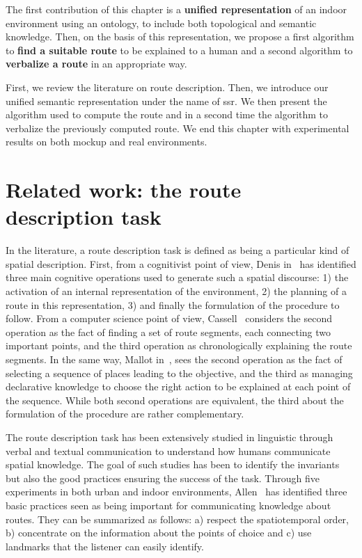 The first contribution of this chapter is a \textbf{unified representation} of an indoor environment using an ontology, to include both topological and semantic knowledge. Then, on the basis of this representation, we propose a first algorithm to \textbf{find a suitable route} to be explained to a human and a second algorithm to \textbf{verbalize a route} in an appropriate way.

First, we review the literature on route description. Then, we introduce our unified semantic representation under the name of \acrfull{ssr}. We then present the algorithm used to compute the route and in a second time the algorithm to verbalize the previously computed route. We end this chapter with experimental results on both mockup and real environments.

\section[Related work]{Related work: the route description task}


In the literature, a route description task is defined as being a particular kind of spatial description. First, from a cognitivist point of view, Denis in~\cite{denis_1997_description} has identified three main cognitive operations used to generate such a spatial discourse: 1) the activation of an internal representation of the environment, 2) the planning of a route in this representation, 3) and finally the formulation of the procedure to follow. From a computer science point of view, Cassell~\cite{cassell_2007_trading} considers the second operation as the fact of finding a set of route segments, each connecting two important points, and the third operation as chronologically explaining the route segments. In the same way, Mallot in~\cite{mallot_2009_embodied}, sees the second operation as the fact of selecting a sequence of places leading to the objective, and the third as managing declarative knowledge to choose the right action to be explained at each point of the sequence. While both second operations are equivalent, the third about the formulation of the procedure are rather complementary.

The route description task has been extensively studied in linguistic through verbal and textual communication to understand how humans communicate spatial knowledge. The goal of such studies has been to identify the invariants but also the good practices ensuring the success of the task. Through five experiments in both urban and indoor environments, Allen~\cite{allen_2000_principles} has identified three basic practices seen as being important for communicating knowledge about routes. They can be summarized as follows: a) respect the spatiotemporal order, b) concentrate on the information about the points of choice and c) use landmarks that the listener can easily identify.

